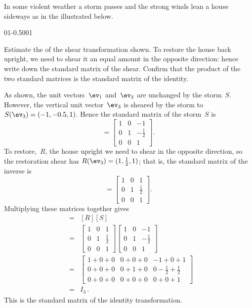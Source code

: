 \begin{example} \label{eg:stormLT}
In some violent weather a storm passes and the strong winds lean a house sideways as in the  illustrated below.
\begin{center}\def\unithousesize{small}
01{-0.5}001
\end{center}
Estimate the  of the shear transformation shown.
To restore the house back upright, we need to shear it an equal amount in the opposite direction: hence write down the standard matrix of the  shear.
Confirm that the product of the two standard matrices is the standard matrix of the identity.
\begin{solution} 
As shown, the unit vectors~\(\ev_1\) and~\(\ev_2\) are unchanged by the storm~\(S\).  
However, the vertical unit vector~\(\ev_3\) is sheared by the storm to \(S(\ev_3)=(-1,-0.5,1)\).
Hence the standard matrix of the storm~\(S\) is
\begin{equation*}
[S]=\begin{bmatrix} 1&0&-1\\0&1&-\tfrac12\\0&0&1 \end{bmatrix}.
\end{equation*}
To restore,~\(R\), the house upright we need to shear in the opposite direction, so the restoration shear has \(R(\ev_3)=(1,\tfrac12,1)\); that is, the standard matrix of the inverse is
\begin{equation*}
[R]=\begin{bmatrix} 1&0&1\\0&1&\tfrac12\\0&0&1 \end{bmatrix}.
\end{equation*}
Multiplying these matrices together gives
\begin{eqnarray*}
[R\circ S]&=&[R][S]
\\&=&\begin{bmatrix} 1&0&1\\0&1&\tfrac12\\0&0&1 \end{bmatrix}
\begin{bmatrix} 1&0&-1\\0&1&-\tfrac12\\0&0&1 \end{bmatrix}
\\&=&\begin{bmatrix} 1+0+0&0+0+0&-1+0+1\\
0+0+0&0+1+0&0-\tfrac12+\tfrac12\\
0+0+0&0+0+0&0+0+1 \end{bmatrix}
\\&=&I_3\,.
\end{eqnarray*}
This is the standard matrix of the identity transformation.
\end{solution}
\end{example}


